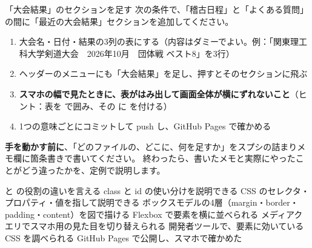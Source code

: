 \begin{challenge}{「大会結果」のセクションを足す}
次の条件で、「稽古日程」と「よくある質問」の間に「最近の大会結果」セクションを追加してください。
\begin{enumerate}
  \item 大会名・日付・結果の3列の表にする（内容はダミーでよい。例：「関東理工科大学剣道大会　2026年10月　団体戦 ベスト8」を3行）
  \item ヘッダーのメニューにも「大会結果」を足し、押すとそのセクションに飛ぶ
  \item \textbf{スマホの幅で見たときに、表がはみ出して画面全体が横にずれないこと}（ヒント：表を  で囲み、その  に  を付ける）
  \item 1つの意味ごとにコミットして push し、GitHub Pages で確かめる
\end{enumerate}
\textbf{手を動かす前に}、「どのファイルの、どこに、何を足すか」をスプシの詰まりメモ欄に箇条書きで書いてください。
終わったら、書いたメモと実際にやったことがどう違ったかを、定例で説明します。
\end{challenge}

\begin{checklist}
\begin{itemize}
  \checkitem {} と  の役割の違いを言える
  \checkitem class と id の使い分けを説明できる
  \checkitem CSS のセレクタ・プロパティ・値を指して説明できる
  \checkitem ボックスモデルの4層（margin・border・padding・content）を図で描ける
  \checkitem Flexbox で要素を横に並べられる
  \checkitem メディアクエリでスマホ用の見た目を切り替えられる
  \checkitem 開発者ツールで、要素に効いている CSS を調べられる
  \checkitem GitHub Pages で公開し、スマホで確かめた
\end{itemize}
\end{checklist}
